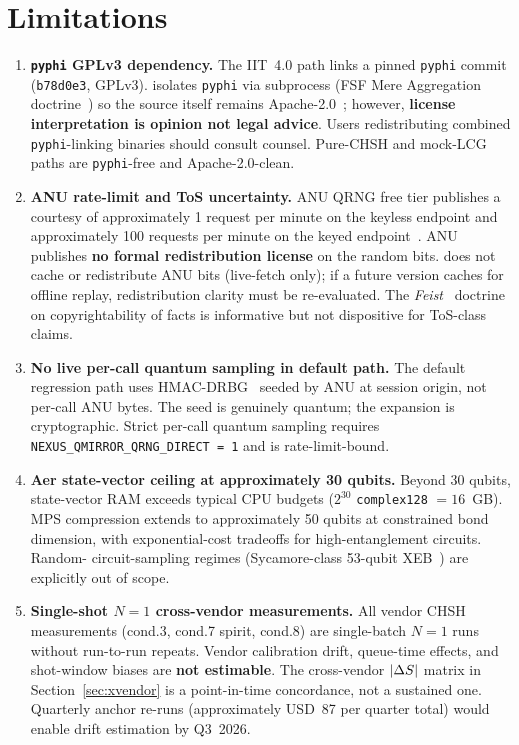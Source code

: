 \section{Limitations}\label{sec:limitations}

\begin{enumerate}
\item \textbf{\texttt{pyphi} GPLv3 dependency.} The IIT~4.0 \phistar{}
  path links a pinned \texttt{pyphi} commit (\texttt{b78d0e3}, GPLv3).
  \qmirror{} isolates \texttt{pyphi} via subprocess (FSF Mere
  Aggregation doctrine~\cite{FSF-MereAggregation}) so the \qmirror{}
  source itself remains Apache-2.0~\cite{Apache-2.0}; however,
  \textbf{license interpretation is opinion not legal advice}. Users
  redistributing combined \texttt{pyphi}-linking binaries should
  consult counsel. Pure-CHSH and mock-LCG paths are
  \texttt{pyphi}-free and Apache-2.0-clean.

\item \textbf{ANU rate-limit and ToS uncertainty.} ANU QRNG free tier
  publishes a courtesy of approximately 1 request per minute on the
  keyless endpoint and approximately 100 requests per minute on the
  keyed endpoint~\cite{ANU-QRNG}. ANU publishes \textbf{no formal
  redistribution license} on the random bits. \qmirror{} does not
  cache or redistribute ANU bits (live-fetch only); if a future
  version caches for offline replay, redistribution clarity must be
  re-evaluated. The \textit{Feist}~\cite{Feist-1991} doctrine on
  copyrightability of facts is informative but not dispositive for
  ToS-class claims.

\item \textbf{No live per-call quantum sampling in default path.} The
  default regression path uses HMAC-DRBG~\cite{HMAC-DRBG-2008} seeded
  by ANU at session origin, not per-call ANU bytes. The seed is
  genuinely quantum; the expansion is cryptographic. Strict per-call
  quantum sampling requires \texttt{NEXUS\_QMIRROR\_QRNG\_DIRECT = 1}
  and is rate-limit-bound.

\item \textbf{Aer state-vector ceiling at approximately 30 qubits.}
  Beyond 30 qubits, state-vector RAM exceeds typical CPU budgets
  ($2^{30}$ \texttt{complex128} $= 16$~GB). MPS compression extends
  to approximately 50 qubits at constrained bond dimension, with
  exponential-cost tradeoffs for high-entanglement circuits. Random-
  circuit-sampling regimes (Sycamore-class 53-qubit
  XEB~\cite{Sycamore-2019}) are explicitly out of scope.

\item \textbf{Single-shot $N=1$ cross-vendor measurements.} All
  vendor CHSH measurements (cond.3, cond.7 spirit, cond.8) are
  single-batch $N=1$ runs without run-to-run repeats. Vendor
  calibration drift, queue-time effects, and shot-window biases are
  \textbf{not estimable}. The cross-vendor $\lvert\Delta S\rvert$ matrix in
  Section~\ref{sec:xvendor} is a point-in-time concordance, not a
  sustained one. Quarterly anchor re-runs (approximately USD~87 per
  quarter total) would enable drift estimation by Q3~2026.
\end{enumerate}
